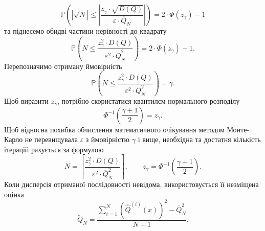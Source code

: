 \begin{equation*}
  \mathbb{P}\left(
    \left|
      \sqrt{N}
    \right|
    \le \left|
      \frac{z_{\gamma} \cdot \sqrt{D\left( Q \right)}}
      {\varepsilon \cdot \overline{Q}_N} \right|
  \right)
  = 2 \cdot \Phi\left( z_{\gamma} \right) - 1
\end{equation*}
та піднесемо обидві частини нерівності до квадрату
\begin{equation*}
  \mathbb{P}\left(
    N
    \le \frac{z^2_{\gamma} \cdot D\left( Q \right)}
      {\varepsilon^2 \cdot \overline{Q}_N^2}
  \right)
  = 2 \cdot \Phi\left( z_{\gamma} \right) - 1.
\end{equation*}
Перепозначимо отриману ймовірність
\begin{equation*}
  \mathbb{P}\left(
    N
    \le \frac{z^2_{\gamma} \cdot D\left( Q \right)}
      {\varepsilon^2 \cdot \overline{Q}_N^2}
  \right)
  = \gamma.
\end{equation*}
Щоб виразити $z_{\gamma}$,
потрібно скористатися квантилєм нормального розподілу
\begin{equation*}
  \Phi^{-1}\left( \frac{\gamma + 1}{2} \right) = z_{\gamma}.
\end{equation*}
Щоб відносна похибка обчислення математичного очікування методом Монте-Карло
не перевищувала $\varepsilon$ з ймовірністю $\gamma$ і вище,
необхідна та достатня кількість ітерацій рахується за формулою
\begin{equation*}
    N
    = \left\lceil \frac{z^2_{\gamma} \cdot D\left( Q \right)}
      {\varepsilon^2 \cdot \overline{Q}_N^2} \right\rceil, \qquad
    z_{\gamma} = \Phi^{-1}\left( \frac{\gamma + 1}{2} \right).
\end{equation*}
Коли дисперсія отриманої послідовності невідома,
використовується її незміщена оцінка
\begin{equation*}
  \widetilde{Q}_N
  = \frac{
    \sum\limits_{i=1}^{N}
      \left( \hat{Q}^{\left( i \right)}\left( x \right) \right)^2
    - \overline{Q}_N^2}{N - 1}.
\end{equation*}

